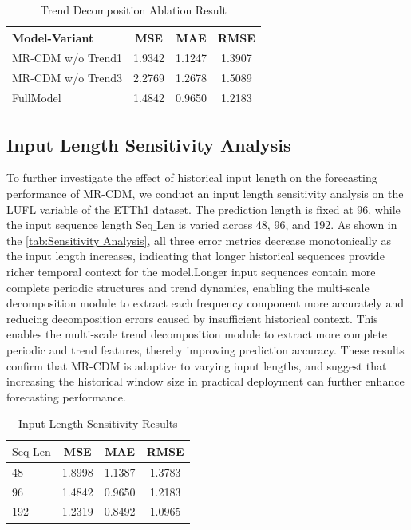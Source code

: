 \begin{table}[h]
\centering
\caption{Trend Decomposition Ablation Result}
\label{tab:ablation_trendDecomposition}
\begin{tabular}{lccc}
\hline
Model-Variant & MSE & MAE & RMSE \\ \hline
MR-CDM w/o Trend1 & {1.9342} & {1.1247} & {1.3907} \\
MR-CDM w/o Trend3 & {2.2769} & {1.2678} & {1.5089} \\
FullModel & {1.4842} & {0.9650} & {1.2183}\\
\hline
\end{tabular}
\end{table}

\subsection{Input Length Sensitivity Analysis}
To further investigate the effect of historical input length on the forecasting performance of MR-CDM, we conduct an input length sensitivity analysis on the LUFL variable of the ETTh1 dataset. The prediction length is fixed at 96, while the input sequence length $\text{Seq\_Len}$ is varied across 48, 96, and 192. As shown in the \autoref{tab:Sensitivity Analysis}, all three error metrics decrease monotonically as the input length increases, indicating that longer historical sequences provide richer temporal context for the model.Longer input sequences contain more complete periodic structures and trend dynamics, enabling the multi-scale decomposition module to extract each frequency component more accurately and reducing decomposition errors caused by insufficient historical context.  This enables the multi-scale trend decomposition module to extract more complete periodic and trend features, thereby improving prediction accuracy. These results confirm that MR-CDM is adaptive to varying input lengths, and suggest that increasing the historical window size in practical deployment can further enhance forecasting performance.

\begin{table}[h]
\centering
\caption{Input Length Sensitivity Results}
\label{tab:Sensitivity Analysis}
\begin{tabular}{lccc}
\hline
$\text{Seq\_Len}$ & MSE & MAE & RMSE \\ \hline
48 & {1.8998} & {1.1387} & {1.3783} \\
96 & {1.4842} & {0.9650} & {1.2183} \\
192 & {1.2319} & {0.8492} & {1.0965}\\
\hline
\end{tabular}
\end{table}

